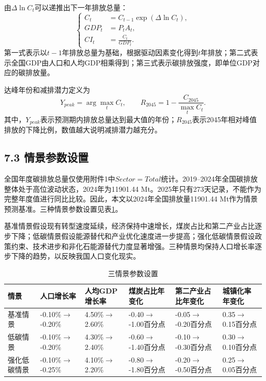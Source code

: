 \documentclass[UTF8,zihao=-4,fontset=windows]{ctexart}
\begin{document}
由$\Delta\ln C_t$可以递推出下一年排放总量：
\[
\left\{
\begin{aligned}
C_t&=C_{t-1}\exp(\Delta\ln C_t),\\
GDP_t&=P_tA_t,\\
CI_t&=\frac{C_t}{GDP_t}.
\end{aligned}
\right.
\]
第一式表示以$t-1$年排放总量为基础，根据驱动因素变化得到$t$年排放；第二式表示全国GDP由人口和人均GDP相乘得到；第三式表示碳排放强度，即单位GDP对应的碳排放量。

达峰年份和减排潜力定义为
\[
Y_{peak}=\arg\max_t C_t,\qquad
R_{2045}=1-\frac{C_{2045}}{\max_t C_t}.
\]
其中，$Y_{peak}$表示预测期内排放总量达到最大值的年份；$R_{2045}$表示2045年相对峰值排放的下降比例，数值越大说明减排潜力越充分。

\subsection*{7.3 情景参数设置}

全国年度碳排放总量仅使用附件1中$Sector=Total$统计。2019--2024年全国碳排放整体处于高位波动状态，2024年为11901.44 Mt。2025年只有273天记录，不能作为完整年度值进行同比比较。因此，本文以2024年全国排放量11901.44 Mt作为情景预测基准。三种情景参数设置见表\ref{tab:scenario_params}。

基准情景假设现有转型速度延续，经济保持中速增长，煤炭占比和第二产业占比逐步下降；低碳情景假设能源替代和产业优化速度进一步提高；强化低碳情景假设政策约束、技术进步和非化石能源替代力度显著增强。三种情景均保持人口增长率逐步下降的趋势，以反映我国人口变化现实。

\begin{table}[H]
\centering
\caption{三情景参数设置}
\label{tab:scenario_params}
\scriptsize
\begin{tabularx}{\textwidth}{lXXXXX}
\toprule
情景 & 人口增长率 & 人均GDP增长率 & 煤炭占比年变化 & 第二产业占比年变化 & 城镇化率年变化 \\
\midrule
基准情景 & -0.10\%$\rightarrow$-0.20\% & 4.50\%$\rightarrow$2.60\% & -0.40$\rightarrow$-1.00百分点 & -0.05$\rightarrow$-0.20百分点 & 0.35$\rightarrow$0.15百分点 \\
低碳情景 & -0.10\%$\rightarrow$-0.20\% & 4.30\%$\rightarrow$2.40\% & -0.60$\rightarrow$-1.40百分点 & -0.10$\rightarrow$-0.30百分点 & 0.30$\rightarrow$0.10百分点 \\
强化低碳情景 & -0.10\%$\rightarrow$-0.25\% & 4.10\%$\rightarrow$2.20\% & -0.80$\rightarrow$-1.80百分点 & -0.20$\rightarrow$-0.50百分点 & 0.25$\rightarrow$0.05百分点 \\
\bottomrule
\end{tabularx}
\end{table}
\end{document}
